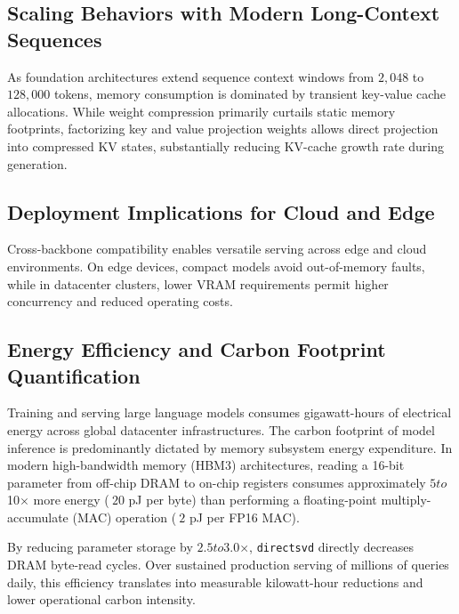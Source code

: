 \subsection{Scaling Behaviors with Modern Long-Context Sequences}
As foundation architectures extend sequence context windows from $2{,}048$ to $128{,}000$ tokens, memory consumption is dominated by transient key-value cache allocations. While weight compression primarily curtails static memory footprints, factorizing key and value projection weights allows direct projection into compressed KV states, substantially reducing KV-cache growth rate during generation.

\subsection{Deployment Implications for Cloud and Edge}
Cross-backbone compatibility enables versatile serving across edge and cloud environments. On edge devices, compact models avoid out-of-memory faults, while in datacenter clusters, lower VRAM requirements permit higher concurrency and reduced operating costs.

\subsection{Energy Efficiency and Carbon Footprint Quantification}
Training and serving large language models consumes gigawatt-hours of electrical energy across global datacenter infrastructures. The carbon footprint of model inference is predominantly dictated by memory subsystem energy expenditure. In modern high-bandwidth memory (HBM3) architectures, reading a 16-bit parameter from off-chip DRAM to on-chip registers consumes approximately $5$\times$ to $10$\times$ more energy ($~20$ pJ per byte) than performing a floating-point multiply-accumulate (MAC) operation ($~2$ pJ per FP16 MAC).

By reducing parameter storage by $2.5$\times$ to $3.0$\times$, \texttt{directsvd} directly decreases DRAM byte-read cycles. Over sustained production serving of millions of queries daily, this efficiency translates into measurable kilowatt-hour reductions and lower operational carbon intensity.
